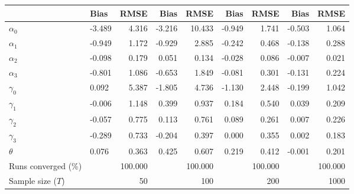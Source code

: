 
\begin{tabular}[t]{llrrrrrrr}
\toprule
  & Bias & RMSE & Bias & RMSE & Bias & RMSE & Bias & RMSE\\
\midrule
$\alpha_{0}$ & -3.489 & 4.316 & -3.216 & 10.433 & -0.949 & 1.741 & -0.503 & 1.064\\
$\alpha_{1}$ & -0.949 & 1.172 & -0.929 & 2.885 & -0.242 & 0.468 & -0.138 & 0.288\\
$\alpha_{2}$ & -0.098 & 0.179 & 0.051 & 0.134 & -0.028 & 0.086 & -0.007 & 0.021\\
$\alpha_{3}$ & -0.801 & 1.086 & -0.653 & 1.849 & -0.081 & 0.301 & -0.131 & 0.224\\
$\gamma_{0}$ & 0.092 & 5.387 & -1.805 & 4.736 & -1.130 & 2.448 & -0.199 & 1.042\\
$\gamma_{1}$ & -0.006 & 1.148 & 0.399 & 0.937 & 0.184 & 0.540 & 0.039 & 0.209\\
$\gamma_{2}$ & -0.057 & 0.775 & 0.113 & 0.761 & 0.089 & 0.261 & 0.007 & 0.226\\
$\gamma_{3}$ & -0.289 & 0.733 & -0.204 & 0.397 & 0.000 & 0.355 & 0.002 & 0.183\\
$\theta$ & 0.076 & 0.363 & 0.425 & 0.607 & 0.219 & 0.412 & -0.001 & 0.201\\
Runs converged (\%) &  & 100.000 &  & 100.000 &  & 100.000 &  & 100.000\\
Sample size ($T$) &  & 50 &  & 100 &  & 200 &  & 1000\\
\bottomrule
\end{tabular}
